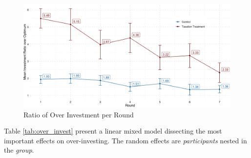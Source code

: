 \begin{figure}
    \centering
    \includegraphics[width=\textwidth]{graphs/over_invest.png}
    \caption{Ratio of Over Investment per Round}
    \label{fig:over_invest}
\end{figure}

Table \ref{tab:over_invest} present a linear mixed model dissecting the most important effects on over-investing. The random effects are \textit{participants} nested in the \textit{group}.\\

